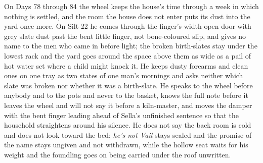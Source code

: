 \documentclass{design/chronicle}
\begin{document}
{On Days 78 through 84 the wheel keeps the house’s time through a week in which nothing is settled, and the room the house does not enter puts its dust into the yard once more. On Silt 22 he comes through the finger’s-width-open door with grey slate dust past the bent little finger, not bone-coloured slip, and gives no name to the men who came in before light; the broken birth-slates stay under the lowest rack and the yard goes around the space above them as wide as a pail of hot water set where a child might knock it. He keeps dusty forearms and clean ones on one tray as two states of one man’s mornings and asks neither which slate was broken nor whether it was a birth-slate. He speaks to the wheel before anybody and to the pots and never to the basket, knows the full note before it leaves the wheel and will not say it before a kiln-master, and moves the damper with the bent finger leading ahead of Sella’s unfinished sentence so that the household straightens around his silence. He does not say the back room is cold and does not look toward the bed; \emph{he’s not Vail} stays sealed and the promise of the name stays ungiven and not withdrawn, while the hollow seat waits for his weight and the foundling goes on being carried under the roof unwritten.

}
\end{document}
